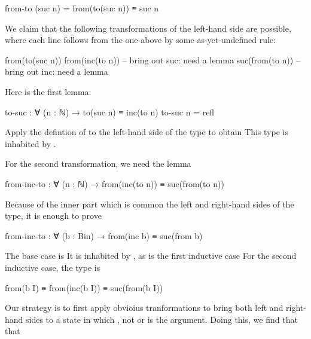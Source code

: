 \begin{colored}[elm]
from-to (suc n) = from(to(suc n)) ≡ suc n
\end{colored}

We claim that the following transformations of the left-hand side are possible, where each line follows from the one above by some as-yet-undefined rule:

\begin{colored}[elm]
from(to(suc n)) 
from(inc(to n)) -- bring out suc: need a lemma
suc(from(to n)) -- bring out inc: need a lemma 
\end{colored}

Here is the first lemma:

\begin{colored}[elm]
to-suc : ∀ (n : ℕ) → to(suc n) ≡ inc(to n)
to-suc n = refl
\end{colored}

Apply the defintion of  to the left-hand side of the type  to obtain  This type is inhabited by . 

For the second transformation, we need the lemma

\begin{colored}[elm]
from-inc-to : ∀ (n : ℕ) → from(inc(to n)) ≡ suc(from(to n))
\end{colored}

Because of the inner part  which is common the left and right-hand sides of the type, it is enough to prove

\begin{colored}[elm]
from-inc-to : ∀ (b : Bin) → from(inc b) ≡ suc(from b)
\end{colored}


The base case is   It is inhabited by  , as is the first inductive case 
  For the second inductive case,  the type is

\begin{colored}[elm]
from(b I) ≡ from(inc(b I)) ≡ suc(from(b I))
\end{colored}

Our strategy is to first apply obvioius tranformations to bring both left and right-hand sides to a state in which , not  or  is the argument.  Doing this, we find that that 

